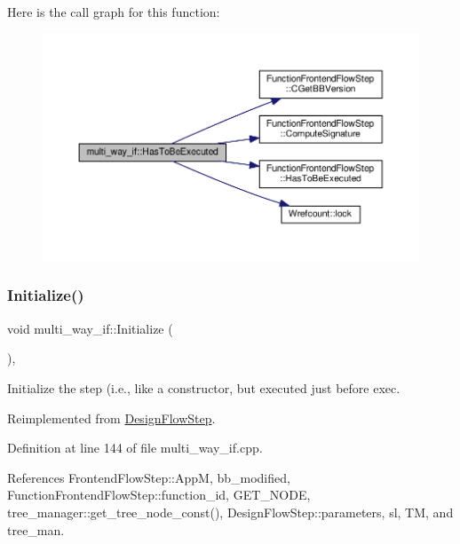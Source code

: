Here is the call graph for this function\+:
\nopagebreak
\begin{figure}[H]
\begin{center}
\leavevmode
\includegraphics[width=350pt]{dd/dca/classmulti__way__if_a067bd457b6d38a33de81d0a3b474f947_cgraph}
\end{center}
\end{figure}
\mbox{\label{classmulti__way__if_a8503a9e02e909dfe59978ad170f2d844}} 
\subsubsection{\texorpdfstring{Initialize()}{Initialize()}}
{\footnotesize\ttfamily void multi\+\_\+way\+\_\+if\+::\+Initialize (\begin{DoxyParamCaption}{ }\end{DoxyParamCaption})\hspace{0.3cm}{\ttfamily [override]}, {\ttfamily [virtual]}}



Initialize the step (i.\+e., like a constructor, but executed just before exec. 



Reimplemented from \hyperlink{classDesignFlowStep_a44b50683382a094976e1d432a7784799}{Design\+Flow\+Step}.



Definition at line 144 of file multi\+\_\+way\+\_\+if.\+cpp.



References Frontend\+Flow\+Step\+::\+AppM, bb\+\_\+modified, Function\+Frontend\+Flow\+Step\+::function\+\_\+id, G\+E\+T\+\_\+\+N\+O\+DE, tree\+\_\+manager\+::get\+\_\+tree\+\_\+node\+\_\+const(), Design\+Flow\+Step\+::parameters, sl, TM, and tree\+\_\+man.

